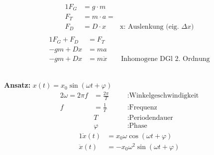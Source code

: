 \documentclass{article}
\begin{document}
	\noindent
	\begin{minipage}{0.55\textwidth}
		\begin{alignat}{1}
			F_G &= g \cdot m\\
			F_T &= m \cdot a =\\
			F_D &= D \cdot x \qquad \text{x: Auslenkung (eig. } \Delta x)\\
		\end{alignat}
		\vspace{-1.5cm}
		\begin{alignat}{1}
			F_G + F_D &= F_T\\
			-g m + D x &= m a\\
			-gm + Dx &= m \ddot{x} \qquad \text{Inhomogene DGl 2. Ordnung}
		\end{alignat}
	\end{minipage}
	\hfill
	\vspace{1cm}\\
	\textbf{Ansatz: } $x (t) = x_0 \sin (\omega t + \varphi)$\\
	\vspace{-0.5cm}
	\begin{alignat}{2}
		\omega = 2\pi f &= \frac{2\pi}{T} &\quad&:\text{Winkelgeschwindigkeit}\\
		f      &= \frac{1}{T}              &\quad&:\text{Frequenz}\\
		& T  &\quad&:\text{Periodendauer}\\
		& \varphi  &\quad&:\text{Phase}
	\end{alignat}
	\vspace{-1cm}
	\begin{alignat}{1}
		\dot{x} (t) &= x_0 \omega \cos (\omega t + \varphi)\\
		\ddot{x} (t) &= -x_0 \omega^2 \sin (\omega t + \varphi)\\
	\end{alignat}
\end{document}
